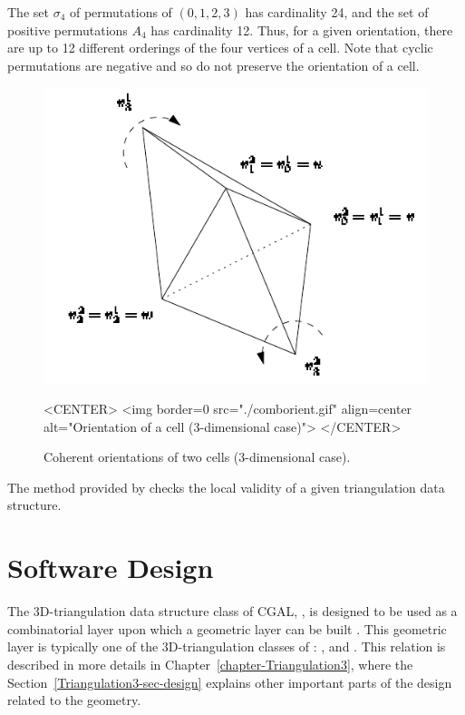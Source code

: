 The set {\Large $\sigma$}$_4$ of permutations of
$(0,1,2,3)$ has cardinality 24, and the set of positive permutations
$A_4$ has cardinality 12. Thus, for a given orientation, there
are up to 12 different orderings of the four vertices of a cell. Note
that cyclic permutations are negative and so do not preserve the
orientation of a cell.

\begin{figure}[htbp]
\begin{ccTexOnly}
\begin{center} 
\includegraphics{TriangulationDS_3/comborient} 
\end{center}
\end{ccTexOnly}
\caption{Coherent orientations of two cells (3-dimensional case).
\label{TDS3-fig-comborient}}
\begin{ccHtmlOnly}
<CENTER>
<img border=0 src="./comborient.gif" align=center alt="Orientation of a cell (3-dimensional case)">
</CENTER>
\end{ccHtmlOnly}
\end{figure} 

The  method provided by
 checks the local validity of a
given triangulation data structure.
 
\section{Software Design}
\label{TDS3-sec-design}

The 3D-triangulation data structure class of CGAL,
, is designed to be used as a combinatorial
layer upon which a geometric layer can be built \cite{k-ddsps-98}. This
geometric layer is typically one of the 3D-triangulation classes of \cgal:
,  and
. This relation is described in more details in
Chapter~\ref{chapter-Triangulation3}, where the
Section~\ref{Triangulation3-sec-design} explains other important parts of the
design related to the geometry.

